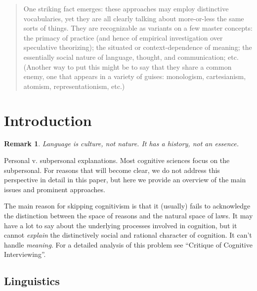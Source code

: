 \documentclass[11pt,twoside]{article}
\newtheorem{remark}{Remark}
\begin{document}
\begin{abstract}
One striking fact emerges: these approaches may employ distinctive
vocabularies, yet they are all clearly talking about more-or-less the
same sorts of things.  They are recognizable as variants on a few
master concepts: the primacy of practice (and hence of empirical
investigation over speculative theorizing); the situated or
context-dependence of meaning; the essentially social nature of
language, thought, and communication; etc.  (Another way to put this
might be to say that they share a common enemy, one that appears in a
variety of guises: monologism, cartesianism, atomism,
representationism, etc.)

\end{abstract}

\tableofcontents
\listoffigures

\newpage
\section{Introduction}

\begin{abstract}

\end{abstract}

\begin{remark}
  Language is culture, not nature.  It has a history, not an essence.
\end{remark}

Personal v. subpersonal explanations.  Most cognitive sciences focus
on the subpersonal.  For reasons that will become clear, we do not
address this perspective in detail in this paper, but here we provide
an overview of the main issues and prominent approaches.

The main reason for skipping cognitivism is that it (usually) fails to
acknowledge the distinction between the space of reasons and the
natural space of laws.  It may have a lot to say about the underlying
processes involved in cognition, but it cannot \textit{explain} the
distinctively social and rational character of cognition.  It can't
handle \textit{meaning}.  For a detailed analysis of this problem see
``Critique of Cognitive Interviewing''.

\subsection{Linguistics}
\end{document}
